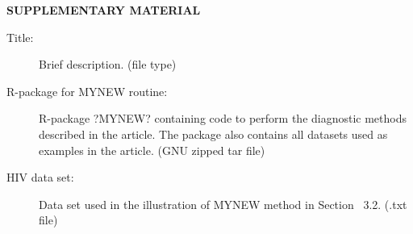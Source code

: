 \documentclass[12pt]{article}
\begin{document}
\appendix

\bigskip
\begin{center}
{\large\bf SUPPLEMENTARY MATERIAL}
\end{center}

\begin{description}

\item[Title:] Brief description. (file type)

\item[R-package for  MYNEW routine:] R-package ?MYNEW? containing code to perform the diagnostic methods described in the article. The package also contains all datasets used as examples in the article. (GNU zipped tar file)

\item[HIV data set:] Data set used in the illustration of MYNEW method in Section~ 3.2. (.txt file)

\end{description}





\end{document}
